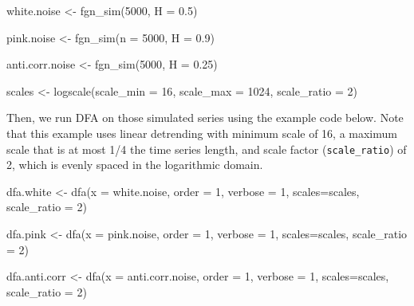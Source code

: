 \documentclass[
  man]{apa6}
\newenvironment{Shaded}{\begin{snugshade}}{\end{snugshade}}
\newcommand{\AttributeTok}[1]{\textcolor[rgb]{0.77,0.63,0.00}{#1}}
\newcommand{\DecValTok}[1]{\textcolor[rgb]{0.00,0.00,0.81}{#1}}
\newcommand{\FloatTok}[1]{\textcolor[rgb]{0.00,0.00,0.81}{#1}}
\newcommand{\FunctionTok}[1]{\textcolor[rgb]{0.00,0.00,0.00}{#1}}
\newcommand{\NormalTok}[1]{#1}
\newcommand{\OtherTok}[1]{\textcolor[rgb]{0.56,0.35,0.01}{#1}}
\begin{document}
\begin{Shaded}
\begin{Highlighting}[]
\NormalTok{white.noise }\OtherTok{\textless{}{-}} \FunctionTok{fgn\_sim}\NormalTok{(}\DecValTok{5000}\NormalTok{, }\AttributeTok{H =} \FloatTok{0.5}\NormalTok{)}

\NormalTok{pink.noise }\OtherTok{\textless{}{-}} \FunctionTok{fgn\_sim}\NormalTok{(}\AttributeTok{n =} \DecValTok{5000}\NormalTok{, }\AttributeTok{H =} \FloatTok{0.9}\NormalTok{)}

\NormalTok{anti.corr.noise }\OtherTok{\textless{}{-}} \FunctionTok{fgn\_sim}\NormalTok{(}\DecValTok{5000}\NormalTok{, }\AttributeTok{H =} \FloatTok{0.25}\NormalTok{)}

\NormalTok{scales }\OtherTok{\textless{}{-}} \FunctionTok{logscale}\NormalTok{(}\AttributeTok{scale\_min =} \DecValTok{16}\NormalTok{, }\AttributeTok{scale\_max =} \DecValTok{1024}\NormalTok{, }\AttributeTok{scale\_ratio =} \DecValTok{2}\NormalTok{)}
\end{Highlighting}
\end{Shaded}

Then, we run DFA on those simulated series using the example code below.
Note that this example uses linear detrending with minimum scale of 16,
a maximum scale that is at most 1/4 the time series length, and scale
factor (\texttt{scale\_ratio}) of 2, which is evenly spaced in the logarithmic
domain.

\begin{Shaded}
\begin{Highlighting}[]
\NormalTok{dfa.white }\OtherTok{\textless{}{-}} \FunctionTok{dfa}\NormalTok{(}\AttributeTok{x =}\NormalTok{ white.noise, }\AttributeTok{order =} \DecValTok{1}\NormalTok{, }\AttributeTok{verbose =} \DecValTok{1}\NormalTok{, }\AttributeTok{scales=}\NormalTok{scales, }\AttributeTok{scale\_ratio =} \DecValTok{2}\NormalTok{)}

\NormalTok{dfa.pink }\OtherTok{\textless{}{-}} \FunctionTok{dfa}\NormalTok{(}\AttributeTok{x =}\NormalTok{ pink.noise, }\AttributeTok{order =} \DecValTok{1}\NormalTok{, }\AttributeTok{verbose =} \DecValTok{1}\NormalTok{,}
\AttributeTok{scales=}\NormalTok{scales, }\AttributeTok{scale\_ratio =} \DecValTok{2}\NormalTok{)}

\NormalTok{dfa.anti.corr }\OtherTok{\textless{}{-}} \FunctionTok{dfa}\NormalTok{(}\AttributeTok{x =}\NormalTok{ anti.corr.noise, }\AttributeTok{order =} \DecValTok{1}\NormalTok{, }\AttributeTok{verbose =} \DecValTok{1}\NormalTok{, }\AttributeTok{scales=}\NormalTok{scales, }\AttributeTok{scale\_ratio =} \DecValTok{2}\NormalTok{)}
\end{Highlighting}
\end{Shaded}
\end{document}
